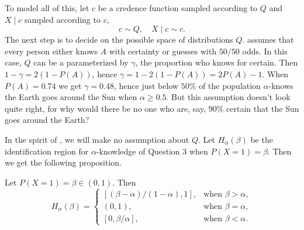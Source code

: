 To model all of this, let $c$ be a credence function sampled according to $Q$ and $X\mid c$ sampled according to $c$,
\[
c\sim Q,\quad X\mid c\sim c.
\]
The next step is to decide on the possible space of distributions $Q$. \textcite[Chapter 2, endnote 28]{Caplan2018-oj} assumes that every person either knows $A$ with certainty or guesses with $50/50$ odds.
In this case, $Q$ can be a parameterized by $\gamma$, the proportion who knows for certain. Then $1-\gamma=2(1-P(A))$, hence $\gamma=1-2(1-P(A))=2P(A)-1$. When $P(A)=0.74$ we get $\gamma=0.48$, hence just below $50\%$ of the population $\alpha$-knows the Earth goes around the Sun when $\alpha\geq0.5$. But this assumption doesn't look quite right, for why would there be no one who are, say, $90\%$ certain that the Sun goes around the Earth?

In the spirit of \textcite{Manski2003-aq}, we will make no assumption about $Q$. Let $H_\alpha(\beta)$ be the identification region for $\alpha$-knowledge of Question 3 when $P(X=1) = \beta$. Then we get the following proposition.
\begin{proposition}
\label{prop:guessing regions}Let $P(X=1)=\beta\in(0,1)$. Then 
\[
H_{\alpha}(\beta)=\begin{cases}
[(\beta-\alpha)/(1-\alpha),1], & \textrm{when }\beta>\alpha,\\
(0,1), & \textrm{when }\beta=\alpha,\\{}
[0,\beta/\alpha], & \textrm{when }\beta<\alpha.
\end{cases}
\]
\end{proposition}


